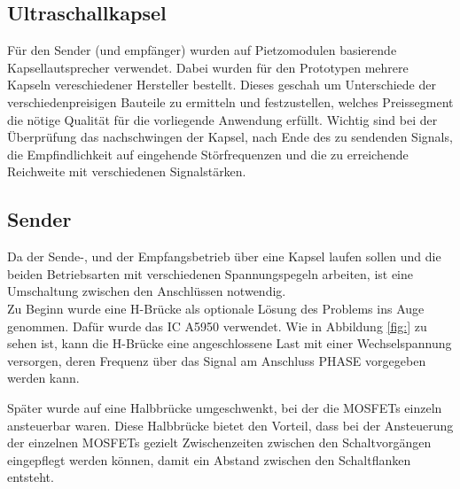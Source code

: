 \subsection{Ultraschallkapsel}
Für den Sender (und empfänger) wurden auf Pietzomodulen basierende Kapsellautsprecher verwendet. Dabei wurden für den Prototypen mehrere Kapseln vereschiedener Hersteller bestellt. Dieses geschah um Unterschiede der verschiedenpreisigen Bauteile zu ermitteln und festzustellen, welches Preissegment die nötige Qualität für die vorliegende Anwendung erfüllt. Wichtig sind bei der Überprüfung das nachschwingen der Kapsel, nach Ende des zu sendenden Signals, die Empfindlichkeit auf eingehende Störfrequenzen und die zu erreichende Reichweite mit verschiedenen Signalstärken.

\subsection{Sender}
Da der Sende-, und der Empfangsbetrieb über eine Kapsel laufen sollen und die beiden Betriebsarten mit verschiedenen Spannungspegeln arbeiten, ist eine Umschaltung zwischen den Anschlüssen notwendig.\\
Zu Beginn wurde eine H-Brücke als optionale Lösung des Problems ins Auge genommen. Dafür wurde das IC A5950 verwendet. Wie in Abbildung \ref{fig:} zu sehen ist, kann die H-Brücke eine angeschlossene Last mit einer Wechselspannung versorgen, deren Frequenz über das Signal am Anschluss PHASE vorgegeben werden kann.

Später wurde auf eine Halbbrücke umgeschwenkt, bei der die MOSFETs einzeln ansteuerbar waren. Diese Halbbrücke bietet den Vorteil, dass bei der Ansteuerung der einzelnen MOSFETs gezielt Zwischenzeiten zwischen den Schaltvorgängen eingepflegt werden können, damit ein Abstand zwischen den Schaltflanken entsteht.

